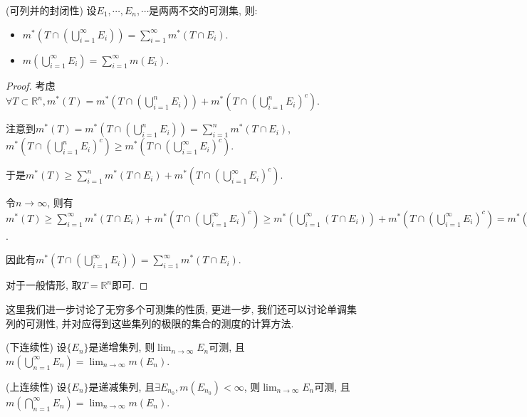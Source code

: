 \documentclass[theorem=false,mathfont=none,openany,sub3section]{easybook}
\begin{document}
\begin{corollary}
  (可列并的封闭性) 设$E_1,\cdots, E_n,\cdots $是两两不交的可测集, 则:\par
  \begin{itemize}
    \item $m^{*}(T\cap (\bigcup_{i=1}^{\infty}E_i))=\sum_{i=1}^{\infty}m^{*}(T\cap E_i)$.
    \item $m(\bigcup_{i=1}^{\infty}E_i)=\sum_{i=1}^{\infty}m(E_i)$.
  \end{itemize}
\end{corollary}

\begin{proof}
  考虑$\forall T\subset \mathbb{R}^n, m^{*}(T)=m^{*}(T\cap (\bigcup_{i=1}^{n}E_i))+m^{*}(T\cap (\bigcup_{i=1}^{n}E_i)^c)$.\par
  注意到$m^{*}(T)=m^{*}(T\cap (\bigcup_{i=1}^{n}E_i))= \sum_{i=1}^{n}m^{*}(T\cap E_i)$, $m^{*}(T\cap (\bigcup_{i=1}^{n}E_i)^c)\geqslant m^{*}(T\cap (\bigcup_{i=1}^{\infty}E_i)^c)$.\par
  于是$m^{*}(T)\geqslant \sum_{i=1}^{n}m^{*}(T\cap E_i)+m^{*}(T\cap (\bigcup_{i=1}^{\infty}E_i)^c)$.\par
  令$n\to \infty$, 则有$m^{*}(T)\geqslant \sum_{i=1}^{\infty}m^{*}(T\cap E_i)+m^{*}(T\cap (\bigcup_{i=1}^{\infty}E_i)^c)\geqslant m^{*}(\bigcup_{i=1}^{\infty}(T\cap E_i))+m^{*}(T\cap (\bigcup_{i=1}^{\infty}E_i)^c) = m^{*}(T\cap (\bigcup_{i=1}^{\infty}E_i))+m^{*}(T\cap (\bigcup_{i=1}^{\infty}E_i)^c)$.\par
  因此有$m^{*}(T\cap (\bigcup_{i=1}^{\infty}E_i))=\sum_{i=1}^{\infty}m^{*}(T\cap E_i)$.\par
  对于一般情形, 取$T=\mathbb{R}^n$即可.\par
\end{proof}

这里我们进一步讨论了无穷多个可测集的性质, 更进一步, 我们还可以讨论单调集列的可测性, 并对应得到这些集列的极限的集合的测度的计算方法.\par

\begin{theorem}
  (下连续性) 设$\{E_n\}$是递增集列, 则$\lim_{n \to \infty}E_n$可测, 且$m(\bigcup_{n=1}^{\infty}E_n)=\lim_{n \to \infty}m(E_n)$.\par
  (上连续性) 设$\{E_n\}$是递减集列, 且$\exists E_{n_0}, m(E_{n_0})<\infty$, 则$\lim_{n \to \infty}E_n$可测, 且$m(\bigcap_{n=1}^{\infty}E_n)=\lim_{n \to \infty}m(E_n)$.\par
\end{theorem}
\end{document}
